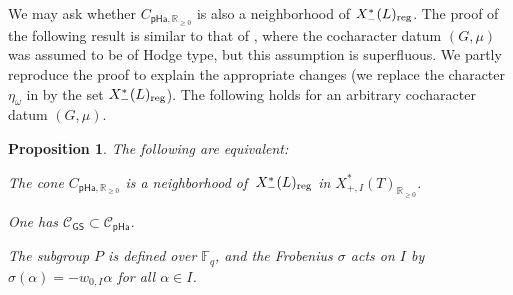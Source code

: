 \documentclass[11pt]{amsart}
\numberwithin{equation}{section}
\newtheorem{proposition}[theorem]{Proposition}
\theoremstyle{definition}
\theoremstyle{remark}
\newcommand{\pha}{\mathsf{pHa}}
\newcommand{\GSsf}{\mathsf{GS}}
\newcommand{\Ccal}{{\mathcal C}}
\newcommand{\FF}{\mathbb{F}}
\newcommand{\RR}{\mathbb{R}}
\newcommand{\reg}{{\rm reg}}
\begin{document}
We may ask whether $C_{\pha, \RR_{\geq 0}}$ is also a neighborhood of $X_{-}^*(L)_{\reg}$. The proof of the following result is similar to that of \cite[Lemma 2.3.1]{Koskivirta-automforms-GZip}, where the cocharacter datum $(G,\mu)$ was assumed to be of Hodge type, but this assumption is superfluous. We partly reproduce  the proof to explain the appropriate changes (we replace the character $\eta_\omega$ in \cite[Lemma 2.3.1]{Koskivirta-automforms-GZip} by the set $X^*_{-}(L)_{\reg}$). The following holds for an arbitrary cocharacter datum $(G,\mu)$. 

\begin{proposition}\label{prop-Hassetype-equivalent}
The following are equivalent:
\begin{equivlist}
\item\label{pHe-1} The cone $C_{\pha, \RR_{\geq 0}}$ is a neighborhood of\, $X^*_{-}(L)_{\reg}$ in $X_{+,I}^*(T)_{\RR_{\geq 0}}$.
\item\label{pHe-2} One has $\Ccal_{\GSsf} \subset \Ccal_{\pha}$.
\item
\label{item-root-data-hasse-type}
The subgroup $P$ is defined over $\FF_q$, and the Frobenius $\sigma$ acts on $I$ by $\sigma(\alpha)=-w_{0,I}\alpha$ for all $\alpha\in I$.
\end{equivlist}
\end{proposition}
\end{document}
